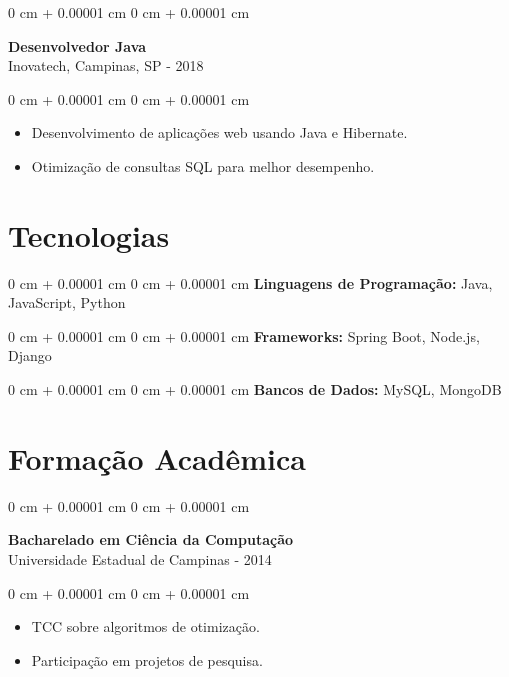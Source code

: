 \documentclass[10pt, letterpaper]{article}
\newenvironment{highlights}{
    \begin{itemize}[
        topsep=0.10 cm,
        parsep=0.10 cm,
        partopsep=0pt,
        itemsep=0pt,
        leftmargin=0 cm + 10pt
    ]
}{
    \end{itemize}
}
\newenvironment{onecolentry}{
    \begin{adjustwidth}{
        0 cm + 0.00001 cm
    }{
        0 cm + 0.00001 cm
    }
}{
    \end{adjustwidth}
}
\begin{document}
\vspace{0.2cm}

\begin{onecolentry}
    \setcolumnwidth{\fill, 4.5cm}
    \begin{paracol}{2}
        \textbf{Desenvolvedor Java} \\ Inovatech, Campinas, SP
        \switchcolumn
         - 2018
    \end{paracol}
\end{onecolentry}
\vspace{0.10cm}
\begin{onecolentry}
    \begin{highlights}
                \item Desenvolvimento de aplicações web usando Java e Hibernate.
                \item Otimização de consultas SQL para melhor desempenho.
    \end{highlights}
\end{onecolentry}

\section{Tecnologias}
\begin{onecolentry}{\textbf{Linguagens de Programação:} Java, JavaScript, Python}\end{onecolentry}
\vspace{0.1cm}
\begin{onecolentry}{\textbf{Frameworks:} Spring Boot, Node.js, Django}\end{onecolentry}
\vspace{0.1cm}
\begin{onecolentry}{\textbf{Bancos de Dados:} MySQL, MongoDB}\end{onecolentry}
\section{Formação Acadêmica}

\begin{onecolentry}
    \setcolumnwidth{\fill, 4.5cm}
    \begin{paracol}{2}
        \textbf{Bacharelado em Ciência da Computação} \\ Universidade Estadual de Campinas
        \switchcolumn
         - 2014
    \end{paracol}
\end{onecolentry}
\vspace{0.10cm}
\begin{onecolentry}
    \begin{highlights}
                \item TCC sobre algoritmos de otimização.
                \item Participação em projetos de pesquisa.
    \end{highlights}
\end{onecolentry}
\end{document}
